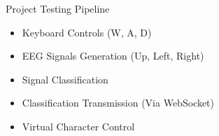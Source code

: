\begin{frame}{Project Testing Pipeline}
    \begin{itemize}
        \item Keyboard Controls (W, A, D)
        \item EEG Signals Generation (Up, Left, Right)
        \item Signal Classification
        \item Classification Transmission (Via WebSocket)
        \item Virtual Character Control
    \end{itemize}
\end{frame}